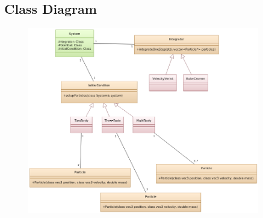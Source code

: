 \documentclass[10pt,a4paper]{amsart}
\begin{document}
\begin{appendix}

\section{Class Diagram}
\label{app:classdiagram}

\begin{figure}[ht]
	\centering
	\includegraphics[width=0.9\textwidth]{../figures/classdiagram.png}
\end{figure}

\end{appendix}
\end{document}
